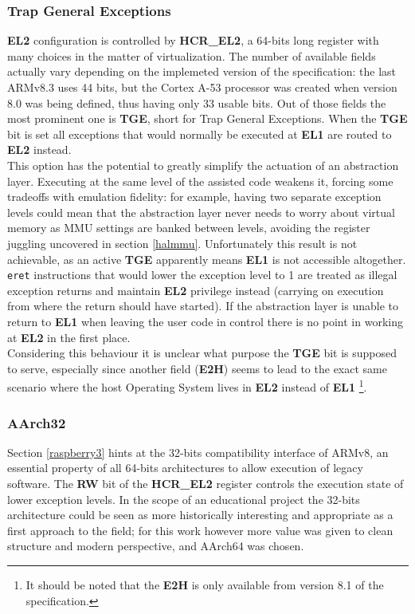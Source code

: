 \documentclass[12pt,a4paper,openright,twoside]{report}
\begin{document}
\subsubsection{Trap General Exceptions}
\textbf{EL2} configuration is controlled by \textbf{HCR\_EL2}, a 64-bits 
long register with many choices in the matter of virtualization. The number
of available fields actually vary depending on the implemeted version of the
specification: the last ARMv8.3 uses 44 bits, but the Cortex A-53 processor was
created when version 8.0 was being defined, thus having only 33 usable bits.
Out of those fields the most prominent one is \textbf{TGE}, short for Trap General
Exceptions. When the \textbf{TGE} bit is set all exceptions that would normally
be executed at \textbf{EL1} are routed to \textbf{EL2} instead.\\
This option has the potential to greatly simplify the actuation of an abstraction
layer. Executing at the same level of the assisted code weakens it, forcing some
tradeoffs with emulation fidelity: for example, having two separate exception
levels could mean that the abstraction layer never needs to worry about virtual
memory as MMU settings are banked between levels, avoiding the register 
juggling uncovered in section \ref{halmmu}.
Unfortunately this result is not achievable, as an active \textbf{TGE} apparently
 means \textbf{EL1} is not accessible altogether. {\tt eret} instructions that
 would lower the exception level to 1 are treated as illegal exception returns 
 and maintain \textbf{EL2} privilege instead (carrying on execution from where
 the return should have started). If the abstraction layer is unable to 
 return to \textbf{EL1} when leaving the user code in control there is no point
 in working at \textbf{EL2} in the first place.\\
 Considering this behaviour it is unclear what purpose the \textbf{TGE} bit
 is supposed to serve, especially since another field (\textbf{E2H}) seems to 
 lead to the exact same scenario where the host Operating System lives in \textbf{EL2}
 instead of \textbf{EL1} \footnote{It should be noted that the \textbf{E2H} is 
 only available from version 8.1 of the specification.}.

\subsubsection{AArch32}
Section \ref{raspberry3} hints at the 32-bits compatibility interface of ARMv8, 
an essential property of all 64-bits architectures to allow execution of legacy
software. The \textbf{RW} bit of the \textbf{HCR\_EL2} register controls the
execution state of lower exception levels. In the scope of an educational project
the 32-bits architecture could be seen as more historically interesting and
appropriate as a first approach to the field; for this work however more value
was given to clean structure and modern perspective, and AArch64 was chosen.
\end{document}
